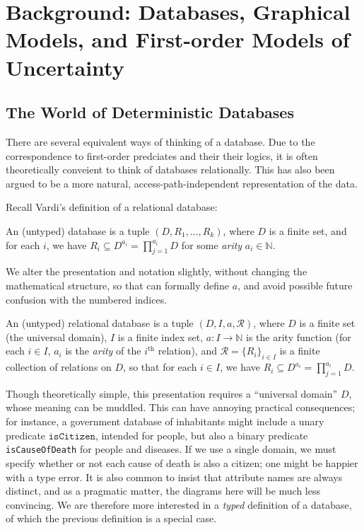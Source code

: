 \documentclass{article}
\theoremstyle{definition}
\theoremstyle{remark}
\begin{document}
\section{Background: Databases, Graphical Models, and First-order Models of Uncertainty}

\subsection{The World of Deterministic Databases}

There are several equivalent ways of thinking of a database. Due to the correspondence to first-order predciates and their their logics, it is often theoretically conveient to think of databases relationally. This has also been argued  to be a more natural, access-path-independent representation of the data.   

Recall Vardi's \cite{vardi} definition of a relational database:
\begin{leftbar}	
\begin{defn*}
    An (untyped) database is a tuple $(D, R_1, \ldots, R_k)$, where $D$ is a finite set, and for each $i$, we have $R_i \subseteq D^{a_i} = \prod_{j =1}^{a_i} D$ 
    for some \emph{arity} $a_i \in \mathbb N$. 
\end{defn*}
\end{leftbar}

We alter the presentation and notation slightly, without changing the mathematical structure, so that can formally define $a$, and avoid possible future confusion with the numbered indices. 

\begin{defn}
    An (untyped) relational database is a tuple $(D, I, a, \mathcal R)$, where $D$ is a
    finite set (the universal domain), $I$ is a finite index set, $a: I \to
    \mathbb N$ is the arity function (for each $i \in I$, $a_i$ is the
    \emph{arity} of the $i^{\text{th}}$ relation), and $\mathcal R = \{R_i\}_{i
    \in I}$ is a finite collection of relations on $D$, so that for each $i \in
    I$, we have $R_i \subseteq D^{a_i} = \prod_{j =1}^{a_i} D$.
\end{defn}

Though theoretically simple, this presentation requires a  ``universal domain'' $D$, whose meaning can be muddled. This can have annoying practical consequences; for instance, a government database of inhabitants might include a unary predicate $\texttt{isCitizen}$, intended for people, but also a binary predicate \texttt{isCauseOfDeath} for people and diseases. If we use a single domain, we must specify whether or not each cause of death is also a citizen; one might be happier with a type error.
It is also common to insist that attribute names are always distinct, and as a pragmatic matter, the diagrams here will be much less convincing. 
%
We are therefore more interested in a \emph{typed} definition of a database, of which the previous definition is a special case.
\end{document}
